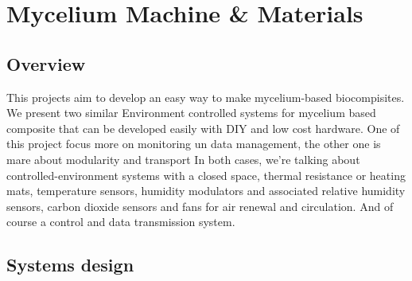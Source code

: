 \chapter{Mycelium Machine \& Materials}


\section{Overview}

This projects aim to develop an easy way to make mycelium-based biocompisites. We present two similar Environment controlled systems for mycelium based composite that can be developed easily with DIY and low cost hardware.
One of this project focus more on monitoring un data management, the other one is mare about modularity and transport 
In both cases, we're talking about controlled-environment systems with a closed space, thermal resistance or heating mats, temperature sensors, humidity modulators and associated relative humidity sensors, carbon dioxide sensors and fans for air renewal and circulation. 
And of course a control and data transmission system. 


\section{Systems design}



